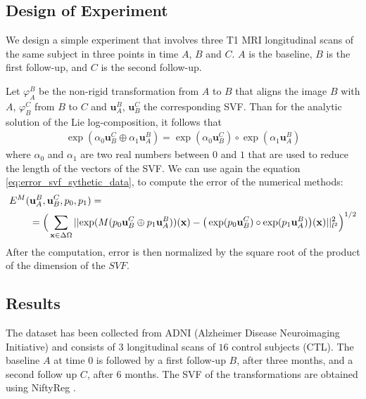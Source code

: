 \subsection{Design of Experiment}
We design a simple experiment that involves three T1 MRI longitudinal scans of the same subject in three points in time $A$, $B$ and $C$. $A$ is the baseline, $B$ is the first follow-up, and $C$ is the second follow-up.

Let $\varphi_{A}^{B}$ be the non-rigid transformation from $A$ to $B$ that aligns the image $B$ with $A$, $\varphi_{B}^{C}$ from $B$ to $C$ and $\mathbf{u}_{A}^{B}$, $\mathbf{u}_{B}^{C}$ the corresponding SVF.
Than for the analytic solution of the Lie log-composition, it follows that
\begin{align*}
	\exp(\alpha_0\mathbf{u}_{B}^{C} \oplus \alpha_1\mathbf{u}_{A}^{B})
	=
	\exp(\alpha_0\mathbf{u}_{B}^{C}) \circ\exp(\alpha_1\mathbf{u}_{A}^{B})
\end{align*} 
where $\alpha_0$ and $\alpha_1$ are two real numbers between $0$ and $1$ that are used to reduce the length of the vectors of the SVF.
We can use again the equation \ref{eq:error_svf_sythetic_data}, to compute the error of the numerical methods:
\begin{equation}
\begin{aligned}\label{eq:error_log_composition_real_data}
E^{M}(&\mathbf{u}_{A}^{B}, \mathbf{u}_{B}^{C}, p_0, p_1) = \\
&= 
\Big( \sum_{\mathbf{x} \in \Delta\Omega} 
\vert\lvert 
	\exp(M(p_0\mathbf{u}_{B}^{C} \oplus p_1\mathbf{u}_{A}^{B}))(\mathbf{x}) 
	-
	\big(\exp(p_0\mathbf{u}_{B}^{C}) \circ\exp(p_1\mathbf{u}_{A}^{B})\big)(\mathbf{x}) 
 \rvert\vert_{l^2}^{2}  \Big)^{1/2}
\end{aligned}
\end{equation}
After the computation, error is then normalized by the square root of the product of the dimension of the $SVF$.

\subsection{Results}
%
The dataset has been collected from ADNI (Alzheimer Disease Neuroimaging Initiative) \cite{jack2008alzheimer} and consists of $3$ longitudinal scans of $16$ control subjects (CTL).
The baseline $A$ at time $0$ is followed by a first follow-up $B$, after three months, and a second follow up $C$, after $6$ months. The SVF of the transformations are obtained using NiftyReg \cite{modat2010fast}. 

